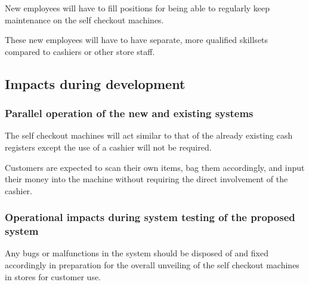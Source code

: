 New employees will have to fill positions for being able to regularly 
keep maintenance on the self checkout machines. \newline

These new employees will have to have separate, more qualified skillsets 
compared to cashiers or other store staff.

\subsection{Impacts during development}

\subsubsection{Parallel operation of the new and existing systems}
The self checkout machines will act similar to that of the already existing 
cash registers except the use of a cashier will not be required. \newline

Customers are expected to scan their own items, bag them accordingly, and 
input their money into the machine without requiring the direct involvement 
of the cashier.

\subsubsection{Operational impacts during system testing of the proposed system}
Any bugs or malfunctions in the system should be disposed of and fixed 
accordingly in preparation for the overall unveiling of the self 
checkout machines in stores for customer use.